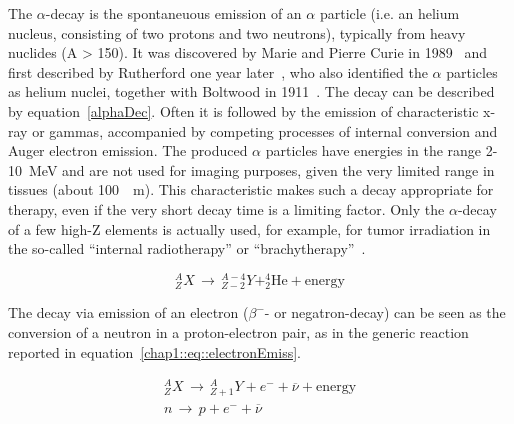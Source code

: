 The $\alpha$-decay  is the spontaneuous emission of an $\alpha$ particle (i.e. an helium nucleus, consisting of two protons and two neutrons), typically from heavy nuclides (A > 150). It was discovered by Marie and Pierre Curie in 1989~\parencite{Curie1898} and first described by Rutherford one year later~\parencite{Rutherford1899}, who also identified the $\alpha$ particles as helium nuclei, together with Boltwood in 1911~\parencite{Boltwood1911}. The decay can be described by equation~\ref{alphaDec}. Often it is followed by the emission of characteristic x-ray or gammas, accompanied by competing processes of internal conversion and Auger electron emission. The produced $\alpha$ particles have energies in the range 2-10~MeV and are not used for imaging purposes, given the very limited range in tissues (about 100~\charmu ~m). This characteristic makes such a decay appropriate for therapy, even if the very short decay time is a limiting factor. Only the $\alpha$-decay of a few high-Z elements is actually used, for example, for tumor irradiation in the so-called \enquote{internal radiotherapy} or \enquote{brachytherapy}~\parencite{Suntharalingam2005, Dahiya2016}. 

\begin{equation}\label{chap1::eq::alphaDec}
^{A}_{Z}X \, \rightarrow \, ^{A-4}_{Z-2}Y + ^{4}_{2}\mathrm{He} + \mathrm{energy}
\end{equation} 

The decay via emission of an electron  ($\beta^-$- or negatron-decay) can be seen as the conversion of a neutron in a proton-electron pair, as in the generic reaction reported in equation~\ref{chap1::eq::electronEmiss}.

\begin{equation}\label{chap1::eq::electronEmiss}
\begin{split}
^{A}_{Z}X \, \rightarrow \, ^{A}_{Z+1}Y + e^{-} + \overline{\nu} + \mathrm{energy} \\
n \, \rightarrow \, p + e^{-} + \overline{\nu} 
\end{split}
\end{equation}   
 

